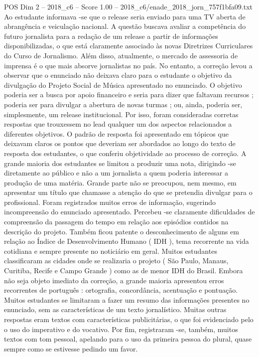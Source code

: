 \begin{textsample}{POS Dim 2 – 2018\_c6 – Score 1.00 – 2018\_c6/enade\_2018\_jorn\_757f1bfa09.txt}
Ao estudante informava -se que o release seria enviado para uma TV aberta de abrangência e veiculação nacional.
A questão buscava avaliar a competência do futuro jornalista para a redação de um release a partir de informações disponibilizadas, o que está claramente associado às novas Diretrizes Curriculares do Curso de Jornalismo.
Além disso, atualmente, o mercado de assessoria de imprensa é o que mais absorve jornalistas no país.
No entanto, a correção levou a observar que o enunciado não deixava claro para o estudante o objetivo da divulgação do Projeto Social de Música apresentado no enunciado.
O objetivo poderia ser a busca por apoio financeiro e seria para dizer que faltavam recursos ; poderia ser para divulgar a abertura de novas turmas ; ou, ainda, poderia ser, simplesmente, um release institucional.
Por isso, foram consideradas corretas respostas que trouxessem no lead qualquer um dos aspectos relacionados a diferentes objetivos.
O padrão de resposta foi apresentado em tópicos que deixavam claros os pontos que deveriam ser abordados ao longo do texto de resposta dos estudantes, o que conferiu objetividade ao processo de correção.
A grande maioria dos estudantes se limitou a produzir uma nota, dirigindo -se diretamente ao público e não a um jornalista a quem poderia interessar a produção de uma matéria.
Grande parte não se preocupou, nem mesmo, em apresentar um título que chamasse a atenção do que se pretendia divulgar para o profissional.
Foram registrados muitos erros de informação, sugerindo incompreensão do enunciado apresentado.
Percebeu -se claramente dificuldades de compreensão da passagem do tempo em relação aos episódios contidos na descrição do projeto.
Também ficou patente o desconhecimento de alguns em relação ao Índice de Desenvolvimento Humano ( IDH ), tema recorrente na vida cotidiana e sempre presente no noticiário em geral.
Muitos estudantes classificaram as cidades onde se realizaria o projeto ( São Paulo, Manaus, Curitiba, Recife e Campo Grande ) como as de menor IDH do Brasil.
Embora não seja objeto imediato da correção, a grande maioria apresentou erros recorrentes de português : ortografia, concordância, acentuação e pontuação.
Muitos estudantes se limitaram a fazer um resumo das informações presentes no enunciado, sem as características de um texto jornalístico.
Muitas outras respostas eram textos com características publicitárias, o que foi evidenciado pelo o uso do imperativo e do vocativo.
Por fim, registraram -se, também, muitos textos com tom pessoal, apelando para o uso da primeira pessoa do plural, quase sempre como se estivesse pedindo um favor.

\end{textsample}
